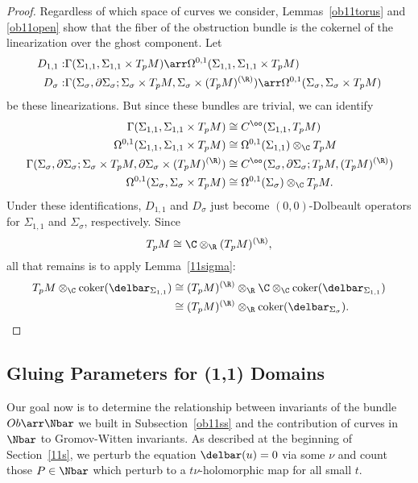 \begin{proposition}
\begin{proof}
Regardless of which space of curves we consider, Lemmas~\ref{ob11torus} and \ref{ob11open} show that the fiber of the obstruction bundle is the cokernel of the linearization over the ghost component. Let
\begin{align*}
D_{1,1}: & \Gamma(\Sigma_{1,1},\Sigma_{1,1} \times T_pM) \arr \Omega^{0,1}(\Sigma_{1,1},\Sigma_{1,1} \times T_pM)
\\
D_\sigma: & \Gamma(\Sigma_\sigma, \partial\Sigma_\sigma; \Sigma_\sigma \times T_pM, \Sigma_\sigma \times (T_pM)^{(\R)}) \arr \Omega^{0,1}(\Sigma_\sigma,\Sigma_\sigma \times T_pM)
\end{align*}
be these linearizations. But since these bundles are trivial, we can identify
\begin{align*}
\Gamma(\Sigma_{1,1},\Sigma_{1,1} \times T_pM) & \cong C^\oo(\Sigma_{1,1}, T_pM)
\\
\Omega^{0,1}(\Sigma_{1,1},\Sigma_{1,1} \times T_pM) & \cong \Omega^{0,1}(\Sigma_{1,1}) \otimes_\C T_pM
\\
\Gamma(\Sigma_\sigma, \partial\Sigma_\sigma; \Sigma_\sigma \times T_pM, \partial\Sigma_\sigma \times (T_pM)^{(\R)}) & \cong C^\oo(\Sigma_\sigma,\partial\Sigma_\sigma; T_pM, (T_pM)^{(\R)})
\\
\Omega^{0,1}(\Sigma_\sigma,\Sigma_\sigma \times T_pM) & \cong \Omega^{0,1}(\Sigma_\sigma) \otimes_\C T_pM.
\end{align*}
Under these identifications, $D_{1,1}$ and $D_\sigma$ just become $(0,0)$-Dolbeault operators for $\Sigma_{1,1}$ and $\Sigma_\sigma$, respectively. Since
\[
T_pM \cong \C \otimes_\R (T_pM)^{(\R)},
\]
all that remains is to apply Lemma~\ref{11sigma}:
\begin{align*}
T_pM \otimes_\C \coker(\delbar_{\Sigma_{1,1}}) & \cong (T_pM)^{(\R)} \otimes_\R \C \otimes_\C \coker(\delbar_{\Sigma_{1,1}})
\\
& \cong (T_pM)^{(\R)} \otimes_\R \coker(\delbar_{\Sigma_\sigma}).
\end{align*}
\end{proof}
\end{proposition}

\subsection{Gluing Parameters for (1,1) Domains} \label{glue11ss}

Our goal now is to determine the relationship between invariants of the bundle $Ob \arr \Nbar$ we built in Subsection~\ref{ob11ss} and the contribution of curves in $\Nbar$ to Gromov-Witten invariants. As described at the beginning of Section~\ref{11s}, we perturb the equation $\delbar(u) = 0$ via some $\nu$ and count those $P \in \Nbar$ which perturb to a $t\nu$-holomorphic map for all small $t$.


